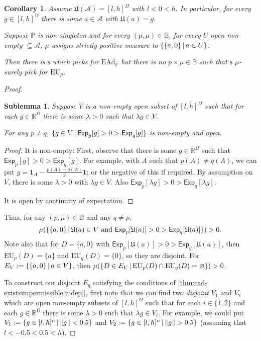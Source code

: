 \documentclass[a4paper]{article}
\newtheorem{corollary}[theorem]{Corollary}
\newtheorem{sublemma}{Sublemma}[theorem]
\newcommand\A{\mathcal{A}}
\renewcommand\P{\mathbb{P}} %
\newcommand\Exp{\mathsf{Exp}}
\newcommand\EU{\mathrm{EU}}
\newcommand\EAd{\mathrm{EAd}}
\newcommand\U{\mathfrak{U}} %
\newcommand\s{\mathsf{s}}
\newcommand{\IB}{\mathbb{B}}
\newcommand{\IP}{\P}
\renewcommand{\Re}{\mathbb{R}}
\renewcommand{\color}[1]{}
\newenvironment{colored}[1]{\leavevmode\color{#1}}{}
\newcommand\SetDelimiter[1][]{
	\nonscript\,#1\vert \allowbreak \nonscript\,\mathopen{}}
\providecommand\given{\SetDelimiter}
\renewcommand{\emptyset}{\varnothing}
\newenvironment{CCM rewritten}
{\begingroup\color{blue}} %
{\endgroup}              %
\begin{document}
\begin{colored}{violet}
\begin{corollary}
	Assume $\U(\A)=[l,h]^\Omega$ with $l<0<h$. In particular, for every $g\in [l,h]^\Omega$ there is some $a\in \A$ with $\U(a)=g$. 


	Suppose $\IP$ is non-singleton and for every $(p,\mu)\in\IB$, for every $U$ open non-empty $\subseteq\A$, $\mu$ assigns strictly positive measure to $\{\{a,0\}\given a\in U\}$.

Then there is $\s$ which picks for $\EAd_\IP$ but there is no $p\times\mu\in \IB$ such that $\s$ $\mu$-surely pick for $\EU_p$.
\end{corollary}
\begin{proof}





\begin{sublemma}
	Suppose $V$ is a non-empty open subset of $[l,h]^\Omega$ such that for each $g\in \Re^\Omega$ there is some $\lambda>0$ such that $\lambda g\in V$. 
	
	For any $p\neq q$, $\{g\in V\given \Exp_p[g]>0>\Exp_q[g]\}$ is non-empty and open.
\end{sublemma}
\begin{proof}
	{It is non-empty}:
	First, observe that there is some $g\in\Re^\Omega$ such that $\Exp_p[g]>0>\Exp_q[g]$. For example, with $A$ such that $p(A)\neq q(A)$, we can put $g=\mathbf{1}_A-\frac{p(A)-q(A)}{2}\mathbf{1}$; or the negative of this if required. 
	By assumption on $V$, there is some $\lambda >0$ with $\lambda g\in V$. Also $\Exp_p[\lambda g]>0>\Exp_{q}[\lambda g]$. 
	
	It is open by continuity of expectation. 
\end{proof}

Thus, for any $(p,\mu)\in\IB$ and any $q\neq p$, $$\mu(\{\{a,0\}\given \U(a)\in V\text{ and }\Exp_p[\U(a)]>0>\Exp_q[\U(a)] \})>0.$$ Note also that for $D=\{a,0\}$ with $\Exp_p[\U(a)]>0>\Exp_q[\U(a)]$, then $\EU_{p}(D)=\{a\}$ and $\EU_q(D)=\{0\}$, so they are disjoint. 
For $E_V:=\{\{a,0\}\given a\in V\}$, then $\mu(\{D\in E_V\given \EU_p(D)\cap\EU_q(D)=\emptyset\})>0$. 

To construct our disjoint $E_q$ satisfying the conditions of \cref{thm:ead-existsimpermissible[indep]}, first note that we can find two \emph{disjoint} $V_1$ and $V_2$ which are open non-empty subsets of $[l,h]^\Omega$ such that for each $i\in\{1,2\}$ and each $g\in \Re^\Omega$ there is some $\lambda>0$ such that $\lambda g\in V_i$.
For example, we could put  $V_1:=\{g\in[l,h]^n\given \|g\|<0.5\}$ and $V_2:=\{g\in[l,h]^n\given \|g\|>0.5\}$ (assuming that $l<-0.5<0.5<h$). 



\end{proof}
\end{colored}
\end{document}
